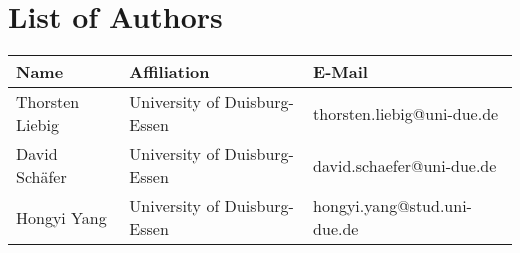 \chapter*{List of Authors}

\begin{tabularx}{\textwidth}{llX}
  \textbf{Name}&\textbf{Affiliation}&\textbf{E-Mail} \\ \hline
  Thorsten Liebig&University of Duisburg-Essen&thorsten.liebig@uni-due.de \\ 
  David Schäfer&University of Duisburg-Essen&david.schaefer@uni-due.de \\
  Hongyi Yang&University of Duisburg-Essen&hongyi.yang@stud.uni-due.de
\end{tabularx}
